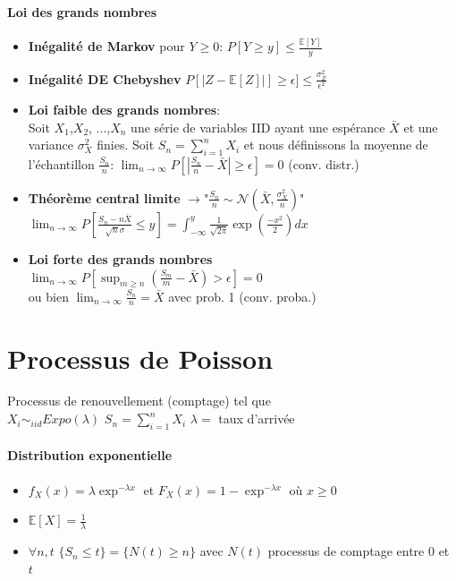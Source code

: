\documentclass[paper=a4,fontsize=8pt,pagesize,DIV=calc]{scrartcl}
\newcounter{row}
\begin{document}
\begin{multicols}{3}
\paragraph{Loi des grands nombres}
\begin{itemize}
\item \textbf{Inégalité de Markov} pour $Y\geq 0$: $P[Y\geq y]\leq \frac{\mathbb{E}[Y]}{y}$ 
\item \textbf{Inégalité DE Chebyshev}  $P[|Z-\mathbb{E}[Z]|] \geq \epsilon]\leq \frac{\sigma_Z^2}{\epsilon^2}$
\item \textbf{Loi faible des grands nombres}:
\\ Soit $X_1$,$X_2$, ...,$X_n$ une série de variables IID ayant une espérance $\bar{X}$ et une variance $\sigma_X^2$ finies. Soit $S_n = \sum_{i=1}^n X_i$ et nous définissons la moyenne de l’échantillon $\frac{S_n}{n}$: $\lim_{n\to \infty} P\left[|\frac{S_n}{n}-\bar{X}|\geq \epsilon\right]=0$ (conv. distr.)
\item \textbf{Théorème central limite}  $\rightarrow$"$\frac{S_n}{n}\sim \mathcal{N}(\bar{X}, \frac{\sigma_X^2}{n})$"\\ $\lim_{n\to\infty} P\left[\frac{S_n-n\bar{X}}{\sqrt{n}\sigma} \leq y\right] = \int_{-\infty}^y \frac{1}{\sqrt{2\pi}} \exp\left(\frac{-x^2}{2}\right) dx$
\item \textbf{Loi forte des grands nombres} 
\\ $\lim_{n\to \infty} P\left[\sup_{m\geq n}\left(\frac{S_m}{m}-\bar{X}\right) > \epsilon\right]=0$ \\ou bien $\lim_{n\to \infty}\frac{S_n}{n}=\bar{X}$ avec prob. 1 (conv. proba.)
\end{itemize}
\section{Processus de Poisson}
Processus de renouvellement (comptage) tel que 
\\$X_i\sim_{iid} Expo(\lambda)$ \quad $S_n=\sum_{i=1}^nX_i$ \quad $\lambda=$ taux d'arrivée
\paragraph{Distribution exponentielle}
\begin{itemize}
\item $f_X(x) = \lambda \exp^{-\lambda x} $ et $F_X(x) = 1 - \exp^{-\lambda x} $ où $ x \geq 0$
\item $\mathbb{E}[X] = \frac{1}{\lambda}$
\item $\forall n, t$ $\{S_n \leq t\} = \{N(t) \geq n\}$ avec $N(t)$ processus de comptage entre $0$ et $t$
\end{itemize}

\end{multicols}
\end{document}
